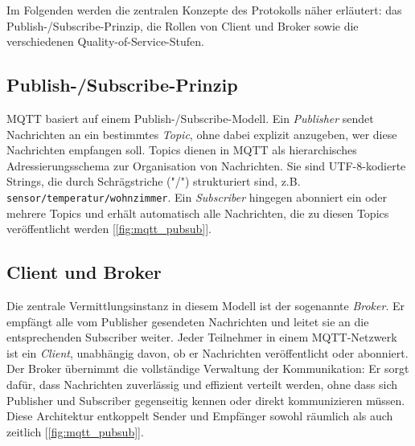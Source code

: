 Im Folgenden werden die zentralen Konzepte des Protokolls näher erläutert: das Publish-/Subscribe-Prinzip, die Rollen von Client und Broker sowie die verschiedenen Quality-of-Service-Stufen.

\subsection*{Publish-/Subscribe-Prinzip}
\label{sub:pub_sub_mqtt}

MQTT basiert auf einem Publish-/Subscribe-Modell. Ein \emph{Publisher} sendet Nachrichten an ein bestimmtes \emph{Topic}, ohne dabei explizit anzugeben, wer diese Nachrichten empfangen soll. Topics dienen in MQTT als hierarchisches Adressierungsschema zur Organisation von Nachrichten. Sie sind UTF-8-kodierte Strings, die durch Schrägstriche ("/") strukturiert sind, z.B. \texttt{sensor/temperatur/wohnzimmer}. Ein \emph{Subscriber} hingegen abonniert ein oder mehrere Topics und erhält automatisch alle Nachrichten, die zu diesen Topics veröffentlicht werden [\autoref{fig:mqtt_pubsub}].

\subsection*{Client und Broker}

Die zentrale Vermittlungsinstanz in diesem Modell ist der sogenannte \emph{Broker}. Er empfängt alle vom Publisher gesendeten Nachrichten und leitet sie an die entsprechenden Subscriber weiter. Jeder Teilnehmer in einem MQTT-Netzwerk ist ein \emph{Client}, unabhängig davon, ob er Nachrichten veröffentlicht oder abonniert. Der Broker übernimmt die vollständige Verwaltung der Kommunikation: Er sorgt dafür, dass Nachrichten zuverlässig und effizient verteilt werden, ohne dass sich Publisher und Subscriber gegenseitig kennen oder direkt kommunizieren müssen. Diese Architektur entkoppelt Sender und Empfänger sowohl räumlich als auch zeitlich \cite[Abschnitt 4.7]{oasis_mqtt_spec} [\autoref{fig:mqtt_pubsub}].

